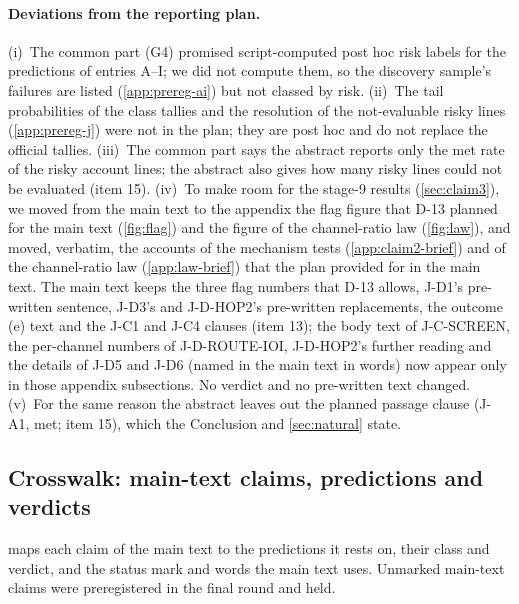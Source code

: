 \paragraph{Deviations from the reporting plan.} (i)~The common part (G4) promised script-computed post hoc risk labels for the predictions of entries A--I; we did not compute them, so the discovery sample's failures are listed (\cref{app:prereg-ai}) but not classed by risk. (ii)~The tail probabilities of the class tallies and the resolution of the not-evaluable risky lines (\cref{app:prereg-j}) were not in the plan; they are post hoc and do not replace the official tallies. (iii)~The common part says the abstract reports only the met rate of the risky account lines; the abstract also gives how many risky lines could not be evaluated (item 15). (iv)~To make room for the stage-9 results (\cref{sec:claim3}), we moved from the main text to the appendix the flag figure that D-13 planned for the main text (\cref{fig:flag}) and the figure of the channel-ratio law (\cref{fig:law}), and moved, verbatim, the accounts of the mechanism tests (\cref{app:claim2-brief}) and of the channel-ratio law (\cref{app:law-brief}) that the plan provided for in the main text. The main text keeps the three flag numbers that D-13 allows, J-D1's pre-written sentence, J-D3's and J-D-HOP2's pre-written replacements, the outcome (e) text and the J-C1 and J-C4 clauses (item 13); the body text of J-C-SCREEN, the per-channel numbers of J-D-ROUTE-IOI, J-D-HOP2's further reading and the details of J-D5 and J-D6 (named in the main text in words) now appear only in those appendix subsections. No verdict and no pre-written text changed. (v)~For the same reason the abstract leaves out the planned passage clause (J-A1, met; item 15), which the Conclusion and \cref{sec:natural} state.

\subsection{Crosswalk: main-text claims, predictions and verdicts}\label{app:crosswalk}

 maps each claim of the main text to the predictions it rests on, their class and verdict, and the status mark and words the main text uses. Unmarked main-text claims were preregistered in the final round and held.


